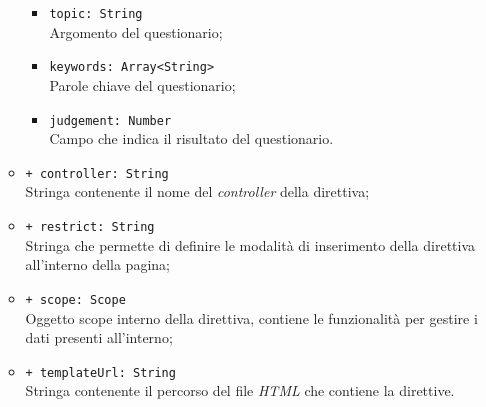 \begin{itemize}
\begin{itemize}
\begin{itemize}
			\item \texttt{topic: String}\\ Argomento del questionario;
			\item \texttt{keywords: Array<String>}\\ Parole chiave del questionario;
			\item \texttt{judgement: Number} \\ Campo che indica il risultato del questionario.
		\end{itemize}
		\item \texttt{+ controller: String} \\ Stringa contenente il nome del \textit{controller} della direttiva;
		\item \texttt{+ restrict: String} \\ Stringa che permette di definire le modalità di inserimento della direttiva all'interno della pagina;
		\item \texttt{+ scope: Scope}\\ Oggetto scope interno della direttiva, contiene le funzionalità per gestire i dati presenti all'interno;
		\item \texttt{+ templateUrl: String}\\ Stringa contenente il percorso del file \textit{HTML} che contiene la direttive.
	\end{itemize}
\end{itemize}